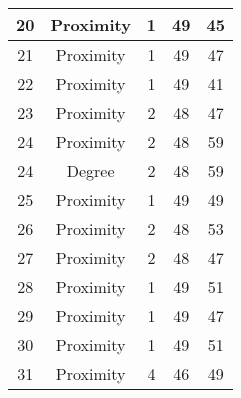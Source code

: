 \documentclass[results.tex]{subfiles}
\begin{document}
\begin{center}
\begin{tabular}{| c || c | c | c | c |}
            \hline
            20                      & Proximity                    & 1                      & 49                      & 45                   \\
            \hline
            21                      & Proximity                    & 1                      & 49                      & 47                   \\
            \hline
            22                      & Proximity                    & 1                      & 49                      & 41                   \\
            \hline
            23                      & Proximity                    & 2                      & 48                      & 47                   \\
            \hline
            24                      & Proximity                    & 2                      & 48                      & 59                   \\
            \hline
            24                      & Degree                       & 2                      & 48                      & 59                   \\
            \hline
            25                      & Proximity                    & 1                      & 49                      & 49                   \\
            \hline
            26                      & Proximity                    & 2                      & 48                      & 53                   \\
            \hline
            27                      & Proximity                    & 2                      & 48                      & 47                   \\
            \hline
            28                      & Proximity                    & 1                      & 49                      & 51                   \\
            \hline
            29                      & Proximity                    & 1                      & 49                      & 47                   \\
            \hline
            30                      & Proximity                    & 1                      & 49                      & 51                   \\
            \hline
            31                      & Proximity                    & 4                      & 46                      & 49                   \\

\end{tabular}
\end{center}
\end{document}
